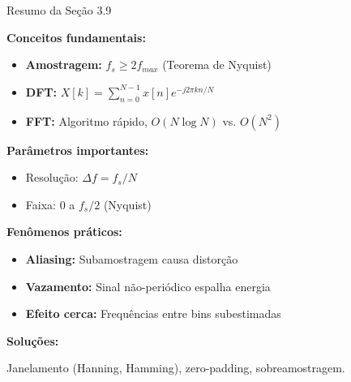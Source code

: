 \begin{frame}{Resumo da Seção 3.9}

\textbf{Conceitos fundamentais:}

\begin{itemize}
\item \textbf{Amostragem:} $f_s \geq 2f_{max}$ (Teorema de Nyquist)
\item \textbf{DFT:} $X[k] = \sum_{n=0}^{N-1} x[n] e^{-j2\pi kn/N}$
\item \textbf{FFT:} Algoritmo rápido, $O(N\log N)$ vs. $O(N^2)$
\end{itemize}

\vspace{0.1cm}

\textbf{Parâmetros importantes:}

\begin{itemize}
\item Resolução: $\Delta f = f_s/N$
\item Faixa: $0$ a $f_s/2$ (Nyquist)
\end{itemize}

\vspace{0.1cm}

\textbf{Fenômenos práticos:}

\begin{itemize}
\item \textbf{Aliasing:} Subamostragem causa distorção
\item \textbf{Vazamento:} Sinal não-periódico espalha energia
\item \textbf{Efeito cerca:} Frequências entre bins subestimadas
\end{itemize}

\vspace{0.1cm}

\textbf{Soluções:}

Janelamento (Hanning, Hamming), zero-padding, sobreamostragem.

\end{frame}
